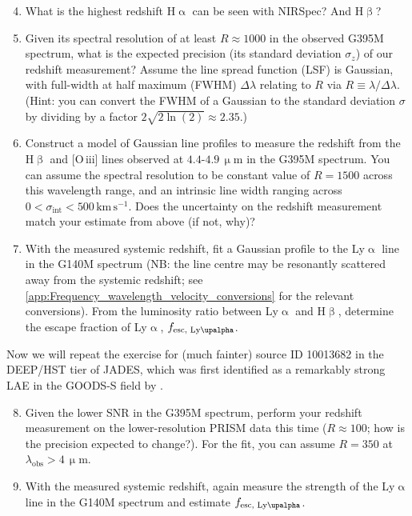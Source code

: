 \documentclass{article}
\newcommand{\Lya}{{Ly\ensuremath{\upalpha}}\xspace}
\newcommand{\OIII}{\hbox{[O\,{\sc iii}]}\xspace}
\newcommand{\Halpha}{\ensuremath{\mathrm{H}\upalpha}\xspace}
\newcommand{\Hbeta}{\ensuremath{\mathrm{H}\upbeta}\xspace}
\theoremstyle{definition}
\begin{document}
\begin{enumerate}[label=(\alph*)]
    \setcounter{enumi}{3}
    \item What is the highest redshift \Halpha can be seen with NIRSpec? And \Hbeta?
    \item Given its spectral resolution of at least $R \approx 1000$ in the observed G395M spectrum, what is the expected precision (its standard deviation $\sigma_z$) of our redshift measurement? Assume the line spread function (LSF) is Gaussian, with full-width at half maximum (FWHM) $\Delta \lambda$ relating to $R$ via $R \equiv \lambda/\Delta\lambda$. (Hint: you can convert the FWHM of a Gaussian to the standard deviation $\sigma$ by dividing by a factor $2 \sqrt{2 \ln(2)} \approx 2.35$.)
    \item Construct a model of Gaussian line profiles to measure the redshift from the \Hbeta and \OIII lines observed at $4.4$-$4.9 \, \mathrm{\upmu m}$ in the G395M spectrum. You can assume the spectral resolution to be constant value of $R = 1500$ across this wavelength range, and an intrinsic line width ranging across $0 < \sigma_\text{int} < 500 \, \mathrm{km \, s^{-1}}$. Does the uncertainty on the redshift measurement match your estimate from above (if not, why)?
    \item With the measured systemic redshift, fit a Gaussian profile to the \Lya line in the G140M spectrum (NB: the line centre may be resonantly scattered away from the systemic redshift; see \cref{app:Frequency_wavelength_velocity_conversions} for the relevant conversions). From the luminosity ratio between \Lya and \Hbeta, determine the escape fraction of \Lya, $f_\text{esc, \Lya}$.
\end{enumerate}

\noindent Now we will repeat the exercise for (much fainter) source ID 10013682 in the DEEP/HST tier of JADES, which was first identified as a remarkably strong LAE in the GOODS-S field by \citet{2023A&A...678A..68S}.

\begin{enumerate}[label=(\alph*)]
    \setcounter{enumi}{7}
    \item Given the lower SNR in the G395M spectrum, perform your redshift measurement on the lower-resolution PRISM data this time ($R \approx 100$; how is the precision expected to change?). For the fit, you can assume $R = 350$ at $\lambda_\mathrm{obs} > 4 \, \mathrm{\upmu m}$.
    \item With the measured systemic redshift, again measure the strength of the \Lya line in the G140M spectrum and estimate $f_\text{esc, \Lya}$.
\end{enumerate}
\end{document}
